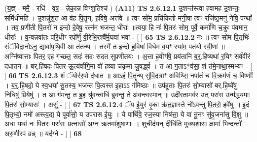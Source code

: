 \documentclass[17pt]{extarticle}
\begin{document}
                  \newline
                      (य॒ज्ञ् - ममै॒ - रधि॑ - वृष॒ - न्नेका॒न्न विꣳ॑श॒तिश्च॑ )  \textbf{(A11)} \newline \newline
                                        \textbf{ TS 2.6.12.1} \newline
                  उ॒शन्त॑स्त्वा हवामह उ॒शन्तः॒ समि॑धीमहि । उ॒शन्नु॑श॒त आ व॑ह पि॒तॄन्. ह॒विषे॒ अत्त॑वे ॥ त्वꣳ सो॑म॒ प्रचि॑कितो मनी॒षा त्वꣳ रजि॑ष्ठ॒मनु॑ नेषि॒ पन्थां᳚ । तव॒ प्रणी॑ती पि॒तरो॑ न इन्दो दे॒वेषु॒ रत्न॑म भजन्त॒ धीराः᳚ ॥त्वया॒ हि नः॑ पि॒तरः॑ सोम॒ पूर्वे॒ कर्मा॑णि च॒क्रुः प॑वमान॒ धीराः᳚ । व॒न्वन्नवा॑तः परि॒धीꣳ रपो᳚र्णु वी॒रेभि॒रश्वै᳚र्म॒घवा॑ भवा - [  ] \textbf{  65} \newline
                  \newline
                                \textbf{ TS 2.6.12.2} \newline
                  नः ॥ त्वꣳ सो॑म पि॒तृभिः॑ संॅविदा॒नोऽनु॒ द्यावा॑पृथि॒वी आ त॑तन्थ । तस्मै॑ त इन्दो ह॒विषा॑ विधेम व॒यꣳ स्या॑म॒ पत॑यो रयी॒णां ॥ अग्नि॑ष्वात्ताः पितर॒ एह ग॑च्छत॒ सदः॑ सदः सदत सुप्रणीतयः । अ॒त्ता ह॒वीꣳषि॒ प्रय॑तानि ब॒र्॒.हिष्यथा॑ र॒यिꣳ सर्व॑वीरं दधातन ॥ बर्.हि॑षदः पितर ऊ॒त्य॑र्वागि॒मा वो॑ ह॒व्या च॑कृमा जु॒षद्ध्वं᳚ । त आ ग॒ताऽ*व॑सा॒ शं त॑मे॒नाथा॒स्मभ्यꣳ॒॒ - [  ] \textbf{  66} \newline
                  \newline
                                \textbf{ TS 2.6.12.3} \newline
                  शं ॅयोर॑र॒पो द॑धात ॥ आऽहं पि॒तॄन्थ् सु॑वि॒दत्राꣳ॑ अविथ्सि॒ नपा॑तं च वि॒क्रम॑णं च॒ विष्णोः᳚ । ब॒र्॒.हि॒षदो॒ ये स्व॒धया॑ सु॒तस्य॒ भज॑न्त पि॒त्वस्त इ॒हाऽऽ ग॑मिष्ठाः ॥ उप॑हूताः पि॒तरः॑ सो॒म्यासो॑ बर्.हि॒ष्ये॑षु नि॒धिषु॑ प्रि॒येषु॑ । त आ ग॑मन्तु॒ त इ॒ह श्रु॑व॒न्त्वधि॑ ब्रुवन्तु॒ ते अ॑वन्त्व॒स्मान् ॥ उदी॑रता॒मव॑र॒ उत् परा॑स॒ उन्म॑द्ध्य॒माः पि॒तरः॑ सो॒म्यासः॑ । असुं॒ - [  ] \textbf{  67} \newline
                  \newline
                                \textbf{ TS 2.6.12.4} \newline
                  ॅय ई॒युर॑ वृ॒का ऋ॑त॒ज्ञास्ते नो॑ऽवन्तु पि॒तरो॒ हवे॑षु ॥ इ॒दं पि॒तृभ्यो॒ नमो॑ अस्त्व॒द्य ये पूर्वा॑सो॒ य उप॑रास ई॒युः । ये पार्थि॑वे॒ रज॒स्या निष॑त्ता॒ ये वा॑ नू॒नꣳ सु॑वृ॒जना॑सु वि॒क्षु ॥ अधा॒ यथा॑ नः पि॒तरः॒ परा॑सः प्र॒त्नासो॑ अग्न ऋ॒तमा॑शुषा॒णाः । शुचीद॑य॒न् दीधि॑ति मुक्थ॒शासः॒ क्षामा॑ भि॒न्दन्तो॑ अरु॒णीरप॑ व्रन्न् ॥ यद॑ग्ने - [  ] \textbf{  68} \newline
\end{document}
